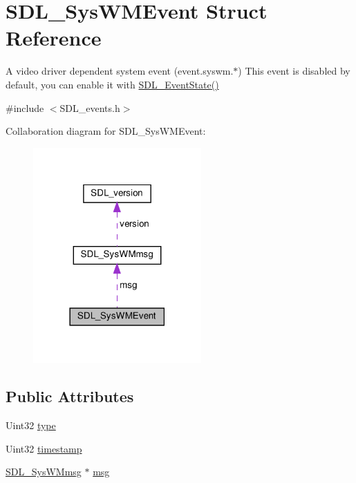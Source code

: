 \hypertarget{structSDL__SysWMEvent}{}\section{S\+D\+L\+\_\+\+Sys\+W\+M\+Event Struct Reference}
\label{structSDL__SysWMEvent}


A video driver dependent system event (event.\+syswm.$\ast$) This event is disabled by default, you can enable it with \hyperlink{SDL__events_8h_afb772893e1c46f186fa39a4defe76df3}{S\+D\+L\+\_\+\+Event\+State()}  




{\ttfamily \#include $<$S\+D\+L\+\_\+events.\+h$>$}



Collaboration diagram for S\+D\+L\+\_\+\+Sys\+W\+M\+Event\+:\nopagebreak
\begin{figure}[H]
\begin{center}
\leavevmode
\includegraphics[width=182pt]{structSDL__SysWMEvent__coll__graph}
\end{center}
\end{figure}
\subsection*{Public Attributes}
\begin{DoxyCompactItemize}
\item 
Uint32 \hyperlink{structSDL__SysWMEvent_a84697e96cb16bf6a570e10b5bfdcd392}{type}
\item 
Uint32 \hyperlink{structSDL__SysWMEvent_a5d3cb97006d99b620c2671c27bd82c06}{timestamp}
\item 
\hyperlink{structSDL__SysWMmsg}{S\+D\+L\+\_\+\+Sys\+W\+Mmsg} $\ast$ \hyperlink{structSDL__SysWMEvent_ad5e3dc68aa15582cd0641847d41c74e8}{msg}
\end{DoxyCompactItemize}


